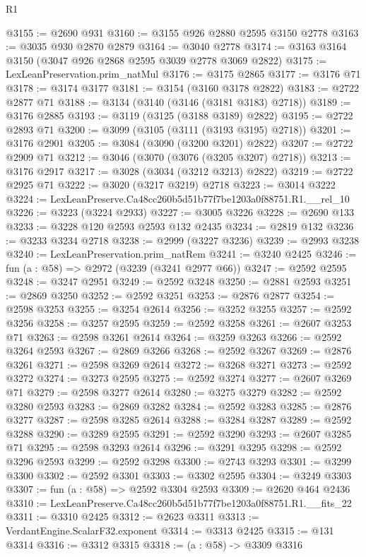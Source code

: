 \begin{lexlean}{R1}
\begin{coremodule}
@3155 := @2690 @931
@3160 := @3155 @926 @2880 @2595 @3150 @2778
@3163 := @3035 @930 @2870 @2879
@3164 := @3040 @2778
@3174 := @3163 @3164 @3150 (@3047 @926 @2868 @2595 @3039 @2778 @3069 @2822)
@3175 := LexLeanPreservation.prim_natMul
@3176 := @3175 @2865
@3177 := @3176 @71
@3178 := @3174 @3177
@3181 := @3154 (@3160 @3178 @2822)
@3183 := @2722 @2877 @71
@3188 := @3134 (@3140 (@3146 (@3181 @3183) @2718))
@3189 := @3176 @2885
@3193 := @3119 (@3125 (@3188 @3189) @2822)
@3195 := @2722 @2893 @71
@3200 := @3099 (@3105 (@3111 (@3193 @3195) @2718))
@3201 := @3176 @2901
@3205 := @3084 (@3090 (@3200 @3201) @2822)
@3207 := @2722 @2909 @71
@3212 := @3046 (@3070 (@3076 (@3205 @3207) @2718))
@3213 := @3176 @2917
@3217 := @3028 (@3034 (@3212 @3213) @2822)
@3219 := @2722 @2925 @71
@3222 := @3020 (@3217 @3219) @2718
@3223 := @3014 @3222
@3224 := LexLeanPreserve.Ca48cc260b5d51b77f7be1203a0f88751.R1.__rel_10
@3226 := @3223 (@3224 @2933)
@3227 := @3005 @3226
@3228 := @2690 @133
@3233 := @3228 @120 @2593 @2593 @132 @2435
@3234 := @2819 @132
@3236 := @3233 @3234 @2718
@3238 := @2999 (@3227 @3236)
@3239 := @2993 @3238
@3240 := LexLeanPreservation.prim_natRem
@3241 := @3240 @2425
@3246 := fun (a : @58) => @2972 (@3239 (@3241 @2977 @66))
@3247 := @2592 @2595
@3248 := @3247 @2951
@3249 := @2592 @3248
@3250 := @2881 @2593
@3251 := @2869 @3250
@3252 := @2592 @3251
@3253 := @2876 @2877
@3254 := @2598 @3253
@3255 := @3254 @2614
@3256 := @3252 @3255
@3257 := @2592 @3256
@3258 := @3257 @2595
@3259 := @2592 @3258
@3261 := @2607 @3253 @71
@3263 := @2598 @3261 @2614
@3264 := @3259 @3263
@3266 := @2592 @3264 @2593
@3267 := @2869 @3266
@3268 := @2592 @3267
@3269 := @2876 @3261
@3271 := @2598 @3269 @2614
@3272 := @3268 @3271
@3273 := @2592 @3272
@3274 := @3273 @2595
@3275 := @2592 @3274
@3277 := @2607 @3269 @71
@3279 := @2598 @3277 @2614
@3280 := @3275 @3279
@3282 := @2592 @3280 @2593
@3283 := @2869 @3282
@3284 := @2592 @3283
@3285 := @2876 @3277
@3287 := @2598 @3285 @2614
@3288 := @3284 @3287
@3289 := @2592 @3288
@3290 := @3289 @2595
@3291 := @2592 @3290
@3293 := @2607 @3285 @71
@3295 := @2598 @3293 @2614
@3296 := @3291 @3295
@3298 := @2592 @3296 @2593
@3299 := @2592 @3298
@3300 := @2743 @3293
@3301 := @3299 @3300
@3302 := @2592 @3301
@3303 := @3302 @2595
@3304 := @3249 @3303
@3307 := fun (a : @58) => @2592 @3304 @2593
@3309 := @2620 @464 @2436
@3310 := LexLeanPreserve.Ca48cc260b5d51b77f7be1203a0f88751.R1.__fits_22
@3311 := @3310 @2425
@3312 := @2623 @3311
@3313 := VerdantEngine.ScalarF32.exponent
@3314 := @3313 @2425
@3315 := @131 @3314
@3316 := @3312 @3315
@3318 := (a : @58) -> @3309 @3316

\end{coremodule}
\end{lexlean}

